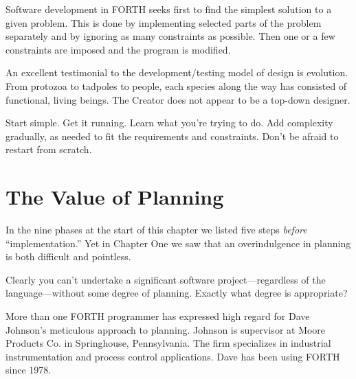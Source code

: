\begin{tfquot}
Software development in FORTH seeks first to find the simplest solution
to a given problem. This is done by implementing selected parts of the
problem separately and by ignoring as many constraints as possible. Then one
or a few constraints are imposed and the program is modified.
\end{tfquot}
An excellent testimonial to the development/testing model of design is
evolution. From protozoa to tadpoles to people, each species along the
way has consisted of functional, living beings. The Creator does not
appear to be a top-down designer.

\begin{tip}
Start simple. Get it running. Learn what you're trying to do. Add
complexity gradually, as needed to fit the requirements and
constraints. Don't be afraid to restart from scratch.
\end{tip}

\section{The Value of Planning}

In the nine phases at the start of this chapter we listed five steps
\emph{before} ``implementation.'' Yet in Chapter One we saw that an
overindulgence in planning is both difficult and pointless.

Clearly you can't undertake a significant software
project---regardless of the language---without some degree of planning.
Exactly what degree is appropriate?

\bigskip\blackline{2ex}
\noindent More than one FORTH programmer has expressed high regard for Dave
Johnson's meticulous approach to planning. Johnson is supervisor at
Moore Products Co. in Springhouse, Pennsylvania. The firm specializes
in industrial instrumentation and process control applications. Dave has
been using FORTH since 1978.

